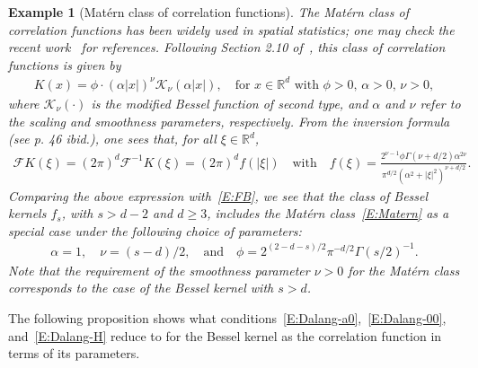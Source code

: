 \documentclass[sn-mathphys]{sn-jnl}%
\newcommand{\BR}{\mathbb{R}}
\numberwithin{equation}{section}
\theoremstyle{thmstyleone}%
\theoremstyle{thmstyletwo}%
\newtheorem{example}{Example}[section]%
\theoremstyle{thmstylethree}%
\begin{document}
\begin{example}[Mat\'ern class of correlation functions]
  The \textit{Mat\'ern class of correlation functions} has been widely used in spatial statistics;
  one may check the recent work~\cite{loh.sun.ea:21:on} for references. Following Section 2.10
  of~\cite{stein:99:interpolation}, this class of correlation functions is given by
  \begin{align}\label{E:Matern}
    K(x) = \phi \cdot (\alpha \lvert x \rvert)^\nu \mathcal{K}_\nu\left(\alpha \lvert x \rvert\right), \quad \text{for
    $x\in\BR^d$ with $\phi>0$, $\alpha>0$, $\nu >0$},
  \end{align}
  where $\mathcal{K}_\nu(\cdot)$ is the modified Bessel function of second type, and $\alpha$ and
  $\nu$ refer to the \textit{scaling and smoothness parameters}, respectively. From the inversion
  formula (see p. 46 \textit{ibid.}), one sees that, for all $\xi\in\BR^d$,
  \begin{align*}
    \mathcal{F}K(\xi) = (2\pi)^{d} \mathcal{F}^{-1} K(\xi) = (2\pi)^d f(\lvert\xi\rvert)
    \quad \text{with} \quad
    f(\xi) = \frac{2^{\nu-1} \phi \Gamma\left(\nu +d/2\right)\alpha^{2\nu}}{\pi^{d/2}\left(\alpha^2+\lvert\xi\rvert^2\right)^{\nu+d/2}}.
  \end{align*}
  Comparing the above expression with~\eqref{E:FB}, we see that the class of Bessel kernels $f_s$,
  with $s>d-2$ and $d\ge 3$, includes the Mat\'ern class~\eqref{E:Matern} as a special case under
  the following choice of parameters:
  \begin{align*}
    \alpha = 1,\quad \nu = (s-d)/2,\quad \text{and} \quad \phi = 2^{(2-d-s)/2} \pi^{-d/2} \Gamma(s /2)^{-1}.
  \end{align*}
  Note that the requirement of the smoothness parameter $\nu>0$ for the Mat\'ern class corresponds
  to the case of the Bessel kernel with $s>d$.
\end{example}


The following proposition shows what conditions~\eqref{E:Dalang-a0},~\eqref{E:Dalang-00},
and~\eqref{E:Dalang-H} reduce to for the Bessel kernel as the correlation function in terms of its
parameters.
\end{document}
